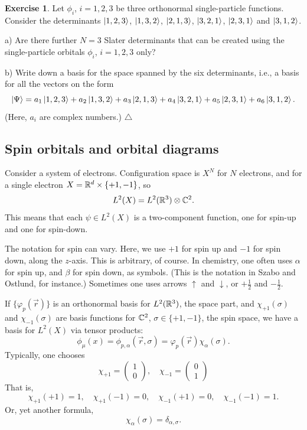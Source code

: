\documentclass{report}
\theoremstyle{plain}
\theoremstyle{definition}
\newtheorem{exerc}{Exercise}[chapter]
\newcommand\xqed[1]{%
  \leavevmode\unskip\penalty9999 \hbox{}\nobreak\hfill
  \quad\hbox{#1}}
\newcommand\demo{\xqed{$\triangle$}}
\newenvironment{exercise}{\bigskip\begin{exerc}}{\demo\end{exerc}\bigskip}
\begin{document}
\begin{exercise}
  Let $\phi_i$, $i=1,2,3$ be three orthonormal single-particle
  functions. 
  Consider the determinants $\ket{1,2,3}$, $\ket{1,3,2}$,
  $\ket{2,1,3}$, $\ket{3,2,1}$, $\ket{2,3,1}$ and $\ket{3,1,2}$.

  a) Are there further $N=3$ Slater determinants that can be created using the
  single-particle orbitals $\phi_i$, $i=1,2,3$ only?

  b) Write down a basis for the space spanned by the six determinants,
  i.e., a basis for all the vectors on the form
  \[ \ket{\Psi} = a_1\ket{1,2,3} + a_2\ket{1,3,2} + a_3\ket{2,1,3} +
  a_4\ket{3,2,1} + a_5\ket{2,3,1} + a_6\ket{3,1,2}. \]
  (Here, $a_i$ are complex numbers.)
\end{exercise}



\subsection{Spin orbitals and orbital diagrams}


Consider a system of electrons. Configuration space is $X^N$ for $N$
electrons, and for a single electron $X = \mathbb{R}^d
\times \{ +1, -1 \}$, so
\[ L^2(X) = L^2(\mathbb{R}^3) \otimes \mathbb{C}^2. \]
This means that each $\psi \in L^2(X)$ is a two-component function, one for spin-up
and one for spin-down. 

The notation for spin can vary. Here, we use $+1$ for spin up and $-1$
for spin down, along the $z$-axis. This is arbitrary, of course. In
chemistry, one often uses $\alpha$ for spin up, and $\beta$ for spin
down, as symbols. (This is the notation in Szabo and Ostlund, for
instance.) Sometimes one uses arrows $\uparrow$ and
$\downarrow$, or $+\tfrac{1}{2}$ and $-\tfrac{1}{2}$.

If $\{\varphi_p(\vec{r})\}$ is an orthonormal
basis for $L^2(\mathbb{R}^3)$, the space part, and $\chi_{+1}(\sigma)$ and
$\chi_{-1}(\sigma)$ are basis functions for $\mathbb{C}^2$, $\sigma \in
\{+1,-1\}$, the spin space,
we have a basis for $L^2(X)$ via tensor products:
\[ \phi_\mu(x) = \phi_{p,\alpha}(\vec{r},\sigma) =
\varphi_p(\vec{r})\chi_{\alpha}(\sigma). \]
Typically, one chooses
\[ \chi_{+1} = \begin{pmatrix} 1 \\ 0 \end{pmatrix}, \quad \chi_{-1}
= \begin{pmatrix} 0 \\ 1 \end{pmatrix} \]
That is,
\[ \chi_{+1}(+1) = 1, \quad \chi_{+1}(-1) = 0, \quad \chi_{-1}(+1) =
0, \quad \chi_{-1}(-1) = 1. \]
Or, yet another formula,
\[ \chi_\alpha(\sigma) = \delta_{\alpha,\sigma}.\]
\end{document}

